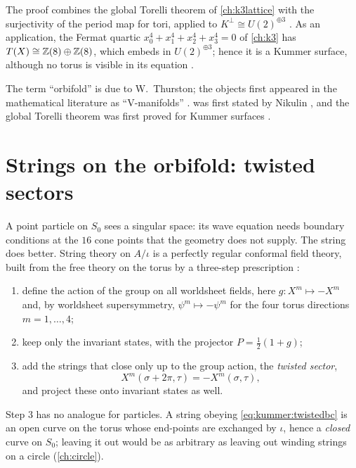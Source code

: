 The proof combines the global Torelli theorem of \cref{ch:k3lattice} with the surjectivity
of the period map for tori, applied to $K^\perp\cong U(2)^{\oplus3}$
. As an application, the Fermat quartic
$x_0^4+x_1^4+x_2^4+x_3^4=0$ of \cref{ch:k3} has $T(X)\cong\mathbb{Z}(8)\oplus\mathbb{Z}(8)$, which embeds in
$U(2)^{\oplus3}$; hence it is a Kummer surface, although no torus is visible in its equation
.

\begin{historybox}
The term ``orbifold'' is due to W.~Thurston; the objects first appeared in the mathematical
literature as ``V-manifolds'' .  was
first stated by Nikulin , and the global Torelli theorem was first
proved for Kummer surfaces .
\end{historybox}

\section{Strings on the orbifold: twisted sectors}\label{sec:kummer:strings}

A point particle on $S_0$ sees a singular space: its wave equation needs boundary conditions
at the $16$ cone points that the geometry does not supply. The string does better. String
theory on $A/\iota$ is a perfectly regular conformal field theory, built from the free theory
on the torus by a three-step prescription :
\begin{enumerate}[leftmargin=*,itemsep=2pt]
\item define the action of the group on all worldsheet fields, here $g\colon X^m\mapsto-X^m$
and, by worldsheet supersymmetry, $\psi^m\mapsto-\psi^m$ for the four torus directions
$m=1,\dots,4$;
\item keep only the invariant states, with the projector $P=\frac12(1+g)$;
\item add the strings that close only up to the group action, the \emph{twisted
sector},
\begin{equation}\label{eq:kummer:twistedbc}
  X^m(\sigma+2\pi,\tau)=-X^m(\sigma,\tau),
\end{equation}
and project these onto invariant states as well.
\end{enumerate}
Step 3 has no analogue for particles. A string obeying \eqref{eq:kummer:twistedbc} is an open
curve on the torus whose end-points are exchanged by $\iota$, hence a \emph{closed} curve on
$S_0$; leaving it out would be as arbitrary as leaving out winding strings on a circle
(\cref{ch:circle}).

